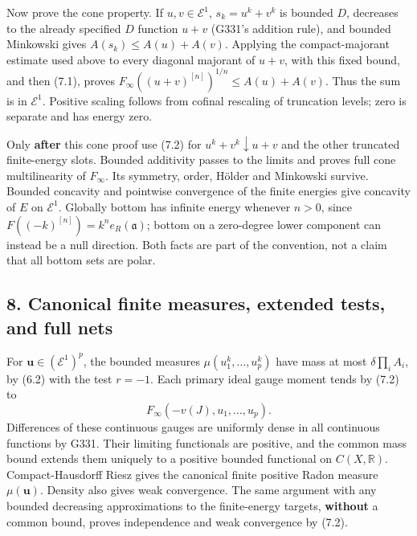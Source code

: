 \documentclass[
]{article}
\begin{document}
Now prove the cone property. If \(u,v\in\mathcal E^1\), \(s_k=u^k+v^k\)
is bounded \(D\), decreases to the already specified \(D\) function
\(u+v\) (G331's addition rule), and bounded Minkowski gives
\(A(s_k)\le A(u)+A(v)\). Applying the compact-majorant estimate used
above to every diagonal majorant of \(u+v\), with this fixed bound, and
then (7.1), proves \(F_\infty((u+v)^{[n]})^{1/n}\le A(u)+A(v)\). Thus
the sum is in \(\mathcal E^1\). Positive scaling follows from cofinal
rescaling of truncation levels; zero is separate and has energy zero.

Only \textbf{after} this cone proof use (7.2) for
\(u^k+v^k\downarrow u+v\) and the other truncated finite-energy slots.
Bounded additivity passes to the limits and proves full cone
multilinearity of \(F_\infty\). Its symmetry, order, Hölder and
Minkowski survive. Bounded concavity and pointwise convergence of the
finite energies give concavity of \(E\) on \(\mathcal E^1\). Globally
bottom has infinite energy whenever \(n>0\), since
\(F((-k)^{[n]})=k^ne_R(\mathfrak a)\); bottom on a zero-degree lower
component can instead be a null direction. Both facts are part of the
convention, not a claim that all bottom sets are polar.

\subsection{8. Canonical finite measures, extended tests, and full
nets}\label{canonical-finite-measures-extended-tests-and-full-nets}

For \(\boldsymbol u\in(\mathcal E^1)^p\), the bounded measures
\(\mu(u_1^k,\ldots,u_p^k)\) have mass at most \(\delta\prod_i A_i\), by
(6.2) with the test \(r=-1\). Each primary ideal gauge moment tends by
(7.2) to \[F_\infty(-v(J),u_1,\ldots,u_p).\] Differences of these
continuous gauges are uniformly dense in all continuous functions by
G331. Their limiting functionals are positive, and the common mass bound
extends them uniquely to a positive bounded functional on
\(C(X,\mathbb R)\). Compact-Hausdorff Riesz gives the canonical finite
positive Radon measure \(\mu(\boldsymbol u)\). Density also gives weak
convergence. The same argument with any bounded decreasing
approximations to the finite-energy targets, \textbf{without} a common
bound, proves independence and weak convergence by (7.2).
\end{document}
